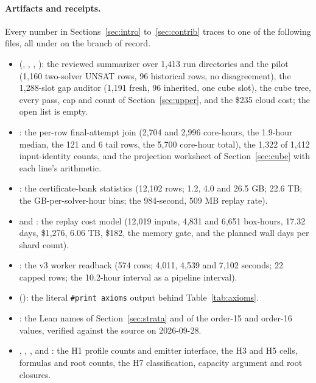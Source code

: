 \documentclass{anvil-paper}
\theoremstyle{definition}
\begin{document}
\paragraph{Artifacts and receipts.}\label{sec:artifacts}
Every number in Sections~\ref{sec:intro} to~\ref{sec:contrib} traces to one of the following files, all under  on the branch of record.
\begin{itemize}
\item {} (, , , ): the reviewed summarizer over 1,413 run directories and the pilot (1,160 two-solver UNSAT rows, 96 historical rows, no disagreement), the 1,288-slot gap auditor (1,191 fresh, 96 inherited, one cube slot), the cube tree, every pass, cap and count of Section~\ref{sec:upper}, and the \$235 cloud cost; the open list is empty.
\item {}: the per-row final-attempt join (2,704 and 2,996 core-hours, the 1.9-hour median, the 121 and 6 tail rows, the 5,700 core-hour total), the 1,322 of 1,412 input-identity counts, and the projection worksheet of Section~\ref{sec:cube} with each line's arithmetic.
\item {}: the certificate-bank statistics (12,102 rows; 1.2, 4.0 and 26.5 GB; 22.6 TB; the GB-per-solver-hour bins; the 984-second, 509 MB replay rate).
\item {} and : the replay cost model (12,019 inputs, 4,831 and 6,651 box-hours, 17.32 days, \$1,276, 6.06 TB, \$182, the memory gate, and the planned wall days per shard count).
\item {}: the v3 worker readback (574 rows; 4,011, 4,539 and 7,102 seconds; 22 capped rows; the 10.2-hour interval as a pipeline interval).
\item {} (): the literal \texttt{\#print axioms} output behind Table~\ref{tab:axioms}.
\item {}: the Lean names of Section~\ref{sec:strata} and of the order-15 and order-16 values, verified against the source on 2026-09-28.
\item {}, , ,  and : the H1 profile counts and emitter interface, the H3 and H5 cells, formulas and root counts, the H7 classification, capacity argument and root closures.

\end{itemize}
\end{document}
